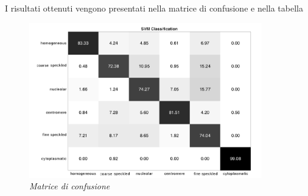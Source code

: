 I risultati ottenuti vengono presentati nella matrice di confusione e nella tabella

\begin{figure}[H] 
  \centering
    \includegraphics[width=0.9\textwidth]{images/conf_mat_2.png}
    \caption{{\small \textit{Matrice di confusione}}}
\end{figure}



